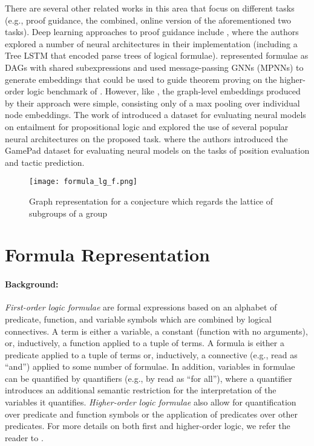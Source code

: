 \documentclass{article}
\begin{document}
There are several other related works in this area that focus on different tasks (e.g., proof guidance, the combined, online version of the aforementioned two tasks). Deep learning approaches to proof guidance include \cite{loos2017deep}, where the authors explored a number of neural architectures in their implementation (including a Tree LSTM that encoded parse trees of logical formulae). \cite{paliwal2019graph} represented formulae as DAGs with shared subexpressions and used message-passing GNNs (MPNNs) to generate embeddings that could be used to guide theorem proving on the higher-order logic benchmark of \cite{bansal2019holist}. However, like \cite{wang2017premise}, the graph-level embeddings produced by their approach were simple, consisting only of a max pooling over individual node embeddings. The work of \cite{evans2018can} introduced a dataset for evaluating neural models on entailment for propositional logic and explored the use of several popular neural architectures on the proposed task. \cite{huang2018gamepad} where the authors introduced the GamePad dataset for evaluating neural models on the tasks of position evaluation and tactic prediction.

\begin{figure*}[t]
\centering
    \footnotesize
\texttt{[image: formula\_lg\_f.png]}
    \caption{Graph representation for a conjecture which regards the lattice of subgroups of a group}
    \label{fig:formula}
    \vspace{-0.1in}
\end{figure*} 
\section{Formula Representation}
\label{sec:formulas}


\paragraph{Background:} {\em First-order logic formulae} are formal expressions based on an alphabet of predicate, function, and variable symbols which are combined by logical connectives.
A term is either a variable, a constant (function with no arguments), or, inductively, a function applied to a tuple of terms. A formula is either a predicate applied to a tuple of terms or, inductively, a connective (e.g.,  read as ``and'') applied to some number of formulae. In addition, variables in formulae can be quantified by quantifiers (e.g., by  read as ``for all''), where a quantifier introduces an additional semantic restriction for the interpretation of the variables it quantifies.
{\em Higher-order logic formulae} also allow for quantification over predicate and function symbols or the application of predicates over other predicates. For more details on both first and higher-order logic, we refer the reader to \cite{taylor1999practical}.
\end{document}
